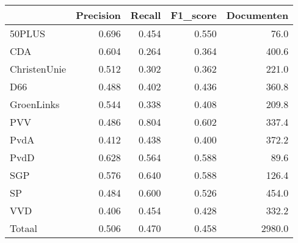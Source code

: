 \begin{tabular}{lrrrr}
\toprule
{} &  Precision &  Recall &  F1\_score &  Documenten \\
\midrule
50PLUS       &      0.696 &   0.454 &     0.550 &        76.0 \\
   CDA       &      0.604 &   0.264 &     0.364 &       400.6 \\
ChristenUnie &      0.512 &   0.302 &     0.362 &       221.0 \\
   D66       &      0.488 &   0.402 &     0.436 &       360.8 \\
  GroenLinks &      0.544 &   0.338 &     0.408 &       209.8 \\
   PVV       &      0.486 &   0.804 &     0.602 &       337.4 \\
  PvdA       &      0.412 &   0.438 &     0.400 &       372.2 \\
  PvdD       &      0.628 &   0.564 &     0.588 &        89.6 \\
   SGP       &      0.576 &   0.640 &     0.588 &       126.4 \\
    SP       &      0.484 &   0.600 &     0.526 &       454.0 \\
   VVD       &      0.406 &   0.454 &     0.428 &       332.2 \\
Totaal       &      0.506 &   0.470 &     0.458 &      2980.0 \\
\bottomrule
\end{tabular}

